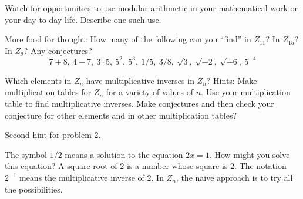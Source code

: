 \documentclass[space,nooutcomes]{ximera}
\begin{document}
\begin{problem}
Watch for opportunities to use modular arithmetic in your mathematical work or your day-to-day life.  Describe one such use.
\end{problem}

\begin{problem}
More food for thought:  How many of the following can you ``find'' in $Z_{11}$? In $Z_15$? In $Z_9$?  Any conjectures? 
\[
7 + 8,\ 4 - 7,\ 3\cdot 5,\ 5^2,\ 5^3,\ 1/5,\ 3/8,\ \sqrt{3},\ \sqrt{-2},\ \sqrt{-6},\ 5^{-4} 
\]
\end{problem}

\begin{problem}
Which elements in $Z_n$ have multiplicative inverses in $Z_n$?  
Hints:  Make multiplication tables for $Z_n$ for a variety of values of $n$.   Use your multiplication table to find multiplicative inverses.  Make conjectures and then check your conjecture for other elements and in other multiplication tables? 
\end{problem}



Second hint for problem 2. 
\begin{hint}
The symbol $1/2$ means a solution to the equation $2x = 1$.  How might you solve this equation?  A square root of $2$ is a number whose square is $2$.  The notation $2^{-1}$ means the multiplicative inverse of $2$.  In $Z_n$, the na\:ive approach is to try all the possibilities.
\end{hint}
\end{document}
